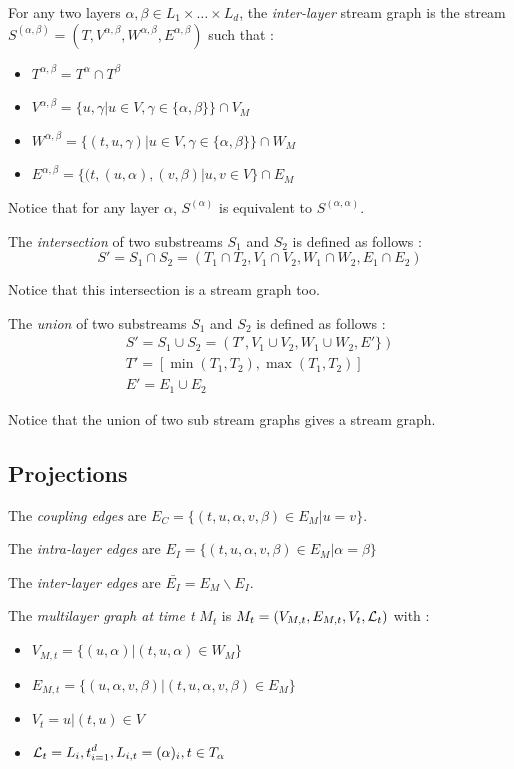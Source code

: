 \documentclass[dvipsnames,a4paper,11pt]{article}
\theoremstyle{definition}
\theoremstyle{remark}
\theoremstyle{remark}
\begin{document}
	For any two layers $\alpha, \beta \in L_1\times \dots\times L_d$, the {\em inter-layer} stream graph is the stream $S^{(\alpha,\beta)} = (T, V^{\alpha,\beta},W^{\alpha,\beta},E^{\alpha,\beta})$ such that :
	\begin{itemize}
		\item $T^{\alpha,\beta}=T^{\alpha}\cap T^{\beta}$
		\item $V^{\alpha,\beta} = \{u,\gamma | u \in V, \gamma \in \{\alpha,\beta\} \} \cap V_M$
		\item $W^{\alpha,\beta}= \{(t,u,\gamma) | u \in V, \gamma \in \{\alpha,\beta\} \} \cap W_M$
	    \item $E^{\alpha,\beta} = \{(t,(u,\alpha),(v,\beta) | u,v \in V\} \cap E_M $
	\end{itemize}

	    Notice that for any layer $\alpha$, $S^{(\alpha)}$ is equivalent to $S^{(\alpha,\alpha)}$.



	The {\em intersection} of two substreams $S_1$ and $S_2$ is defined as follows :
	\[
		S' = S_1 \cap S_2 = (T_1\cap T_2, V_1 \cap V_2, W_1 \cap W_2, E_1\cap E_2)
	\]

	Notice that this intersection is a stream graph too.

	The {\em union} of two substreams $S_1$ and $S_2$ is defined as follows :
	\begin{align*}
		S' = S_1 \cup S_2 = (T', V_1 \cup V_2, W_1 \cup W_2, E' \})\\
		T' = [\min(T_1,T_2),\max(T_1,T_2)]\\
		E' = E_1 \cup E_2 
	\end{align*}

	Notice that the union of two sub stream graphs gives a stream graph.

	

	\subsection{Projections }

    The {\em coupling edges} are $E_C=\{(t,u,\alpha,v,\beta)\in E_M | u=v\}$.

    The {\em intra-layer edges} are $E_I = \{(t,u,\alpha,v,\beta) \in E_M | \alpha = \beta \}$

    The {\em inter-layer edges} are $\bar{E_I} = E_M\backslash E_I$.

   	The {\em multilayer graph at time t} $M_t$ is $M_t = (V_{M,t}, E_{M,t},V_t,{\cal L}_t)$ with :
    \begin{itemize}
		\item $V_{M,t} = \{(u,\alpha)| (t,u,\alpha)\in W_M\}$
		\item $E_{M,t} = \{(u,\alpha,v,\beta) | (t,u,\alpha,v,\beta) \in E_M\}$
		\item $V_t = {u | (t,u) \in V}$
		\item ${\cal L}_t = {L_i,t}_{i=1}^d, L_{i,t}=(\alpha)_i, t\in T_\alpha$
    \end{itemize}
\end{document}
